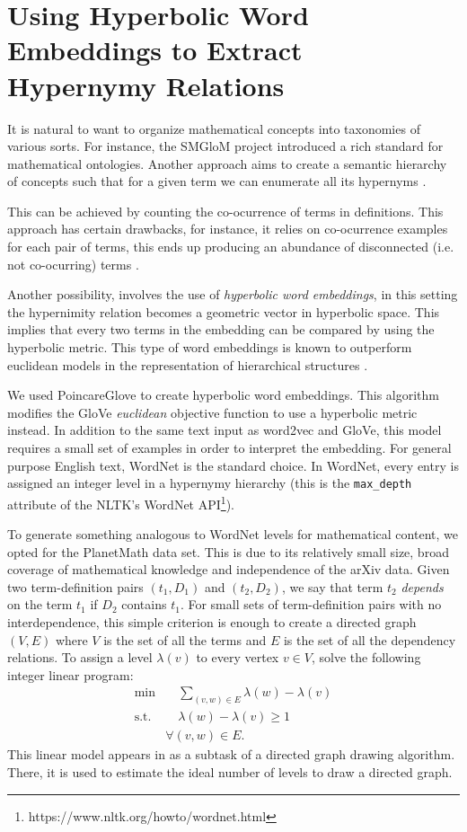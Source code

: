 \documentclass[submission,copyright,creativecommons]{eptcs}
\begin{document}
\section{Using Hyperbolic Word Embeddings to Extract Hypernymy Relations}
It is natural to want to organize mathematical concepts into taxonomies of various sorts.
For instance, the SMGloM project \cite{ginev2016smglom} introduced a rich standard for mathematical ontologies. Another approach aims to create a semantic hierarchy of concepts such that for a given term we can enumerate all its hypernyms \cite{wang-etal-2017-short}.

This can be  achieved by counting the co-ocurrence \cite{hearst-1992-automatic} of terms in definitions. This approach has certain drawbacks, for instance, it relies on co-ocurrence examples for each pair of terms, this ends up producing an abundance of disconnected (i.e. not co-ocurring) terms \cite{aly-etal-2019-every}.

Another possibility, involves the use of \emph{hyperbolic word embeddings}, in this setting the hypernimity relation becomes a geometric vector in hyperbolic space. This implies that every two terms in the embedding can be compared by using the hyperbolic metric.
This type of word embeddings is known to outperform euclidean models in the representation of hierarchical structures \cite{facebookembeds}.

We used PoincareGlove \cite{tifrea2018poincare} to create hyperbolic
word embeddings. This algorithm modifies the GloVe \textit{euclidean} objective function to use a hyperbolic metric instead. 
In addition to the same text input as word2vec and GloVe, this model requires a small set of examples in order to interpret the embedding. 
For general purpose English text, WordNet \cite{wordnet} is the standard  choice. 
In WordNet, every entry is assigned an integer level in a hypernymy hierarchy (this is the
\texttt{max\_depth} attribute of the NLTK's WordNet
API\footnote{https://www.nltk.org/howto/wordnet.html}). 

To generate something  analogous to WordNet levels for mathematical content, we opted for the PlanetMath data set. This is due to its relatively small size, broad coverage of mathematical knowledge and independence of the arXiv data. 
 Given two term-definition pairs $(t_1, D_1)$ and $(t_2, D_2)$, we say that term
$t_2$ \emph{depends} on the term $t_1$ if $D_2$ contains $t_1$.
For small sets of term-definition pairs with no interdependence, this
simple criterion is enough to create a directed graph $(V, E)$ where
$V$ is the set of all the terms and $E$ is the set of all the
dependency relations. To assign a level $\lambda (v)$ to every 
vertex $v\in V$, solve the following integer linear program:
\begin{align*}
    \text{min} & \quad \sum_{(v,w) \in E} \lambda(w) - \lambda(v)  \\
    \text{s.t.} & \quad \lambda(w) - \lambda(v) \geq 1  \\
     & \forall (v,w) \in E. 
\end{align*}
This linear model appears in \cite{graphsGasner} as a subtask of a directed graph drawing algorithm. There, it is used to estimate the ideal number of levels to draw a directed graph. 
\end{document}
